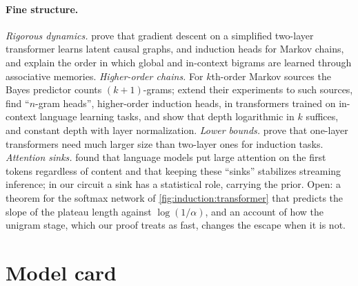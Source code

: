 \begin{refsection}
\paragraph{Fine structure.} \emph{Rigorous dynamics.} \Textcite{NichaniEtAl2024} prove that gradient descent on a simplified two-layer transformer learns latent causal graphs, and induction heads for Markov chains, and \textcite{BiettiEtAl2023} explain the order in which global and in-context bigrams are learned through associative memories. \emph{Higher-order chains.} For $k$th-order Markov sources the Bayes predictor counts $(k+1)$-grams; \textcite{EdelmanEtAl2024} extend their experiments to such sources, \textcite{AkyurekEtAl2024} find ``$n$-gram heads'', higher-order induction heads, in transformers trained on in-context language learning tasks, and \textcite{RajaramanEtAl2024} show that depth logarithmic in $k$ suffices, and constant depth with layer normalization. \emph{Lower bounds.} \Textcite{SanfordEtAl2024} prove that one-layer transformers need much larger size than two-layer ones for induction tasks. \emph{Attention sinks.} \Textcite{XiaoEtAl2024} found that language models put large attention on the first tokens regardless of content and that keeping these ``sinks'' stabilizes streaming inference; in our circuit a sink has a statistical role, carrying the prior. Open: a theorem for the softmax network of \cref{fig:induction:transformer} that predicts the slope of the plateau length against $\log(1/\alpha)$, and an account of how the unigram stage, which our proof treats as fast, changes the escape when it is not.

\section{Model card}\label{sec:induction:card}



\end{refsection}
